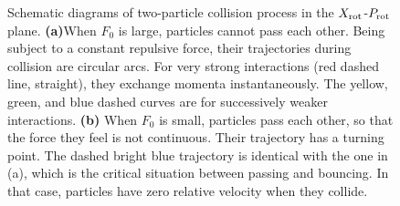 \documentclass[onecolumn,pra]{revtex4-1}
\begin{document}
\begin{figure}[h
]
\caption{Schematic diagrams of two-particle collision process in the $X_{\rm rot}$-$P_{\rm rot}$
  plane. \textbf{(a)}When $F_0$ is large, particles cannot pass each other.  Being subject to a
  constant repulsive force, their trajectories during collision are circular arcs.  For very strong
  interactions (red dashed line, straight), they exchange momenta instantaneously.  The yellow,
  green, and blue dashed curves are for successively weaker interactions.  \textbf{(b)} When $F_0$
  is small, particles pass each other, so that the force they feel is not continuous.  Their
  trajectory has a turning point. The dashed bright blue trajectory is identical with the one in
  (a), which is the critical situation between passing and bouncing. In that case, particles have
  zero relative velocity when they collide. }
\label{fig:Breathingfrequency3}
\end{figure}
\end{document}

